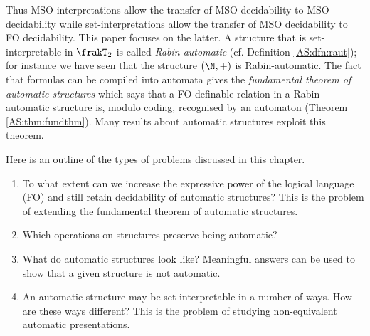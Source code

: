 Thus MSO-interpretations allow the transfer of MSO decidability to MSO decidability while set-interpretations
allow the transfer of MSO decidability to FO decidability. This paper focuses on the latter.
A structure that is set-interpretable in $\frakT_2$ is called {\em Rabin-automatic} (cf. Definition \ref{AS:dfn:raut}); for instance we have seen that
the structure $(\N,+)$ is Rabin-automatic.
The fact that formulas can be compiled into automata gives
the {\em fundamental theorem of automatic
structures} which says that a FO-definable relation in a Rabin-automatic structure
is, modulo coding, recognised by an automaton (Theorem  \ref{AS:thm:fundthm}). Many results about automatic structures exploit this theorem.  


Here is an outline of the types of problems discussed in this chapter.

\begin{enumerate}
\item To what extent can we increase the expressive power of the logical language (FO) and still retain decidability of automatic structures? 
This is the problem of extending the fundamental theorem of automatic structures.
\item Which operations on structures preserve being automatic?
\item What do automatic structures look like? Meaningful answers can be used to show that a given structure is not automatic.
\item An automatic structure may be set-interpretable in a number of ways. How are these ways different?
This is the problem of studying non-equivalent automatic presentations.
\end{enumerate}

